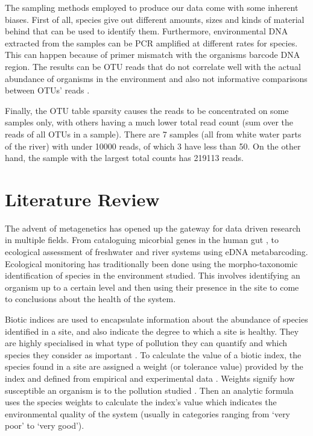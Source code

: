 The sampling methods employed to produce our data come with some inherent biases. First of all, species give out different amounts, sizes and kinds of material behind that can be used to identify them. Furthermore, environmental DNA extracted from the samples can be PCR amplified at different rates for species. This can happen because of primer mismatch with the organisms barcode DNA region. The results can be OTU reads that do not correlate well with the actual abundance of organisms in the environment and also not informative comparisons between OTUs' reads \cite{abundance_nodate}. 

Finally, the OTU table sparsity causes the reads to be concentrated on some samples only, with others having a much lower total read count (sum over the reads of all OTUs in a sample). There are 7 samples (all from white water parts of the river) with under 10000 reads, of which 3 have less than 50. On the other hand, the sample with the largest total counts has 219113 reads. 



\section{Literature Review}
The advent of metagenetics has opened up the gateway for data driven research in multiple fields. From cataloguing micorbial genes in the human gut \cite{dos_santos_human_2010}, to ecological assessment of freshwater \cite{apotheloz-perret-gentil_taxonomy-free_2017} and river systems \cite{chariton_ecological_2010} using eDNA metabarcoding. Ecological monitoring has traditionally been done using the morpho-taxonomic identification of species in the environment studied. This involves identifying an organism up to a certain level and then using their presence in the site to come to conclusions about the health of the system.


Biotic indices are used to encapsulate information about the abundance of species identified in a site, and also indicate the degree to which a site is healthy. They are highly specialised in what type of pollution they can quantify and which species they consider as important \cite{washington_diversity_1984}. To calculate the value of a biotic index, the species found in a site are assigned a weight (or tolerance value) provided by the index and defined from empirical and experimental data \cite{borja_marine_2000}. Weights signify how susceptible an organism is to the pollution studied \cite{carter_chapter_2017}. Then an analytic formula uses the species weights to calculate the index's value which indicates the environmental quality of the system (usually in categories ranging from `very poor' to `very good').

